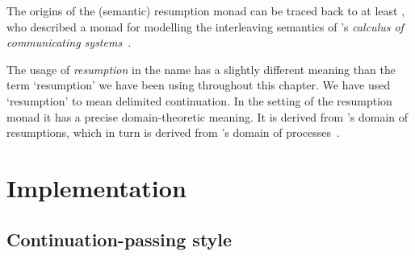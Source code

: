 \documentclass[12pt,phd,lfcs,twoside,openright,logo,leftchapter,normalheadings]{infthesis}
\theoremstyle{plain}
\theoremstyle{definition}
\begin{document}
The origins of the (semantic) resumption monad can be traced back to
at least \citet{Moggi90}, who described a monad for modelling the
interleaving semantics of \citeauthor{Milner75}'s \emph{calculus of
  communicating systems}~\cite{Milner75}.

The usage of \emph{resumption} in the name has a slightly different
meaning than the term `resumption' we have been using throughout this
chapter. We have used `resumption' to mean delimited continuation. In
the setting of the resumption monad it has a precise domain-theoretic
meaning. It is derived from \citeauthor{Plotkin76}'s domain of
resumptions, which in turn is derived from \citeauthor{Milner75}'s
domain of processes~\cite{Milner75,Plotkin76}.


\part{Implementation}
\label{p:implementation}

\chapter{Continuation-passing style}
\label{ch:cps}
\end{document}
